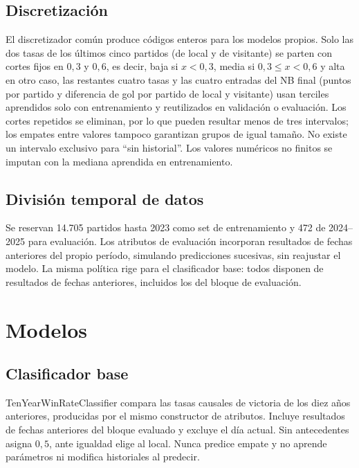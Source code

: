 \documentclass[conference]{IEEEtran}
\begin{document}
\subsection{Discretización}
El discretizador común produce códigos enteros para los modelos propios. Solo las dos tasas de los últimos cinco partidos (de local y de visitante) se parten con cortes fijos en $0{,}3$ y $0{,}6$, es decir, baja si $x<0{,}3$, media si $0{,}3\leq x<0{,}6$ y alta en otro caso, las restantes cuatro tasas y las cuatro entradas del NB final (puntos por partido y diferencia de gol por partido de local y visitante) usan terciles aprendidos solo con entrenamiento y reutilizados en validación o evaluación. Los cortes repetidos se eliminan, por lo que pueden resultar menos de tres intervalos; los empates entre valores tampoco garantizan grupos de igual tamaño. No existe un intervalo exclusivo para ``sin historial''. Los valores numéricos no finitos se imputan con la mediana aprendida en entrenamiento.

\subsection{División temporal de datos}
Se reservan 14.705 partidos hasta 2023 como set de entrenamiento y 472 de 2024--2025 para evaluación. Los atributos de evaluación incorporan resultados de fechas anteriores del propio período, simulando predicciones sucesivas, sin reajustar el modelo. La misma política rige para el clasificador base: todos disponen de resultados de fechas anteriores, incluidos los del bloque de evaluación.

\section{Modelos}
\label{sec:modelos}

\subsection{Clasificador base}
TenYearWinRateClassifier compara las tasas causales de victoria de los diez años anteriores, producidas por el mismo constructor de atributos. Incluye resultados de fechas anteriores del bloque evaluado y excluye el día actual. Sin antecedentes asigna $0{,}5$, ante igualdad elige al local. Nunca predice empate y no aprende parámetros ni modifica historiales al predecir.
\end{document}
